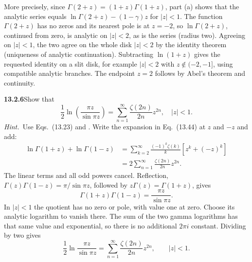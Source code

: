 More precisely, since $\Gamma(2+z)=(1+z)\Gamma(1+z)$, part (a)
shows that the analytic series equals
$\ln\Gamma(2+z)-(1-\gamma)z$ for $|z|<1$.  The function
$\Gamma(2+z)$ has no zeros and its nearest pole is at $z=-2$, so
$\ln\Gamma(2+z)$, continued from zero, is analytic on $|z|<2$, as is
the series (radius two).  Agreeing on $|z|<1$, the two agree on the
whole disk $|z|<2$ by the identity theorem (uniqueness of analytic
continuation).  Subtracting $\ln(1+z)$ gives the requested
identity on a slit disk, for example
$|z|<2$ with $z\notin(-2,-1]$, using compatible analytic branches.
The endpoint $z=2$ follows by Abel's theorem and continuity.


\par\bigskip
\noindent\textbf{13.2.6}\quad Show that
\[
\frac{1}{2}\ln\left(\frac{\pi z}{\sin\pi z}\right)
=\sum_{n=1}^{\infty}\frac{\zeta(2n)}{2n}z^{2n},\quad|z| < 1.
\]
\emph{Hint.}~Use Eqs.~(13.23) and .
\solution
Write the expansion in Eq.~(13.44) at $z$ and $-z$ and add:
\begin{align*}
\ln\Gamma(1+z)+\ln\Gamma(1-z)
&=\sum_{k=2}^{\infty}\frac{(-1)^k\zeta(k)}k
 [z^k+(-z)^k]\\
&=2\sum_{n=1}^{\infty}\frac{\zeta(2n)}{2n}z^{2n}.
\end{align*}
The linear terms and all odd powers cancel.  Reflection,
$\Gamma(z)\Gamma(1-z)=\pi/\sin\pi z$, followed by
$z\Gamma(z)=\Gamma(1+z)$, gives
\[
\Gamma(1+z)\Gamma(1-z)=\frac{\pi z}{\sin\pi z}.
\]
In $|z|<1$ the quotient has no zero or pole, with value one at
zero.  Choose its analytic logarithm to vanish there.  The sum
of the two gamma logarithms has that same value and exponential,
so there is no additional $2\pi i$ constant.  Dividing by two gives
\[
\boxed{\frac12\ln\frac{\pi z}{\sin\pi z}
=\sum_{n=1}^{\infty}\frac{\zeta(2n)}{2n}z^{2n}},\qquad |z|<1.
\]


